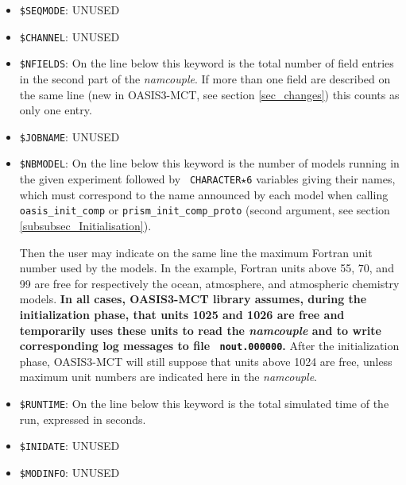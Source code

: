 \begin{itemize}

\item {\tt \$SEQMODE}: UNUSED 

\item {\tt \$CHANNEL}: UNUSED

\item {\tt \$NFIELDS}: On the line below this keyword is the total
number of field entries in the second part of
the {\it namcouple}. If more than one field are described on the same
line (new in OASIS3-MCT, see section \ref{sec_changes}) this counts as only one entry. 

\item {\tt \$JOBNAME}: UNUSED

\item {\tt \$NBMODEL}: On the line below this keyword is the number of
models running in the given experiment followed by {\tt
CHARACTER$\star$6} variables giving their names, which must correspond
to the name announced by each model when calling {\tt
  oasis\_init\_comp} or {\tt prism\_init\_comp\_proto} (second argument, see section \ref{subsubsec_Initialisation}). 

Then the user may
indicate on the same line the maximum Fortran unit number used by the models. In  the
example, Fortran units above 55, 70, and 99 are free for respectively
the ocean, atmosphere, and atmospheric chemistry models. {\bf In all cases,
OASIS3-MCT library assumes, during the initialization phase, that units 1025 and 1026 are free and
temporarily uses these units to read the {\it
  namcouple} and to write corresponding log messages to file {\tt
  nout.000000}.} After the initialization phase, OASIS3-MCT will
still suppose that units above 1024 are free, unless
maximum unit numbers are indicated here in the {\it namcouple}.

\item {\tt \$RUNTIME}: On the line below this keyword is the total
simulated time of the run, expressed in seconds. 

\item {\tt \$INIDATE}: UNUSED

\item {\tt \$MODINFO}: UNUSED
 

\end{itemize}
